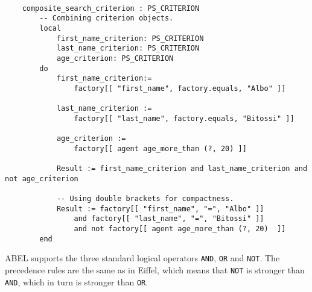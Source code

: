 \documentclass[a4paper,12pt]{report}
\begin{document}
\begin{lstlisting}[language=OOSC2Eiffel, captionpos=b, caption={Combining criteria.}, label={lst:search_albo_bitossi}]

	composite_search_criterion : PS_CRITERION
		-- Combining criterion objects.
		local
			first_name_criterion: PS_CRITERION
			last_name_criterion: PS_CRITERION
			age_criterion: PS_CRITERION
		do
			first_name_criterion:= 
				factory[[ "first_name", factory.equals, "Albo" ]]

			last_name_criterion := 
				factory[[ "last_name", factory.equals, "Bitossi" ]]

			age_criterion := 
				factory[[ agent age_more_than (?, 20) ]]
			
			Result := first_name_criterion and last_name_criterion and not age_criterion

			-- Using double brackets for compactness. 
			Result := factory[[ "first_name", "=", "Albo" ]] 
				and factory[[ "last_name", "=", "Bitossi" ]] 
				and not factory[[ agent age_more_than (?, 20)  ]]
		end
\end{lstlisting}

ABEL supports the three standard logical operators \lstinline!AND!, \lstinline!OR! and \lstinline!NOT!. 
The precedence rules are the same as in Eiffel, which means that \lstinline!NOT! is stronger than \lstinline!AND!, which in turn is stronger than \lstinline!OR!.

% 
% 
% 
\end{document}
